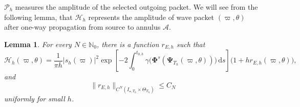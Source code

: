 \documentclass[11pt,reqno]{amsart}
\newtheorem{lemma}{Lemma}[section]
\newcommand{\dd}{\,\mathrm{d}}
\numberwithin{equation}{section}
\begin{document}
$\mathscr P_h$ measures the amplitude of the selected outgoing packet. We will see from the following lemma, that $\mathcal H_h$ represents the amplitude of wave packet $(\varpi,\theta)$ after one-way propagation from source to annulus $\mathcal A$.

\begin{lemma}
For every $N\in\mathbb N_0$, there is a function $r_{E,h}$ such that
\begin{equation}\label{eq:measured-energy}
 \mathcal H_h(\varpi,\theta)
 =\frac{1}{\pi h}|s_h(\varpi)|^2
 \exp\left[-2\int_0^{t_{0,h}}
 \gamma\bigl(\bm\Phi^s(\bm\Psi_{T_h}(\varpi,\theta))\bigr)\dd s\right]
 \bigl(1+h r_{E,h}(\varpi,\theta)\bigr),
\end{equation}
and
\begin{equation*}
 \|r_{E,h}\|_{C^N(I_{\star,T_h}\times\Theta_{T_h})}\le C_N
\end{equation*}
uniformly for small $h$.
\end{lemma}
\end{document}

